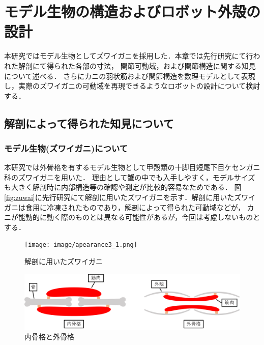 \newpage
\section{モデル生物の構造およびロボット外殻の設計}
本研究ではモデル生物としてズワイガニを採用した．本章では先行研究\cite{hasegawa}にて行われた解剖にて得られた各部の寸法，
関節可動域，および関節構造に関する知見について述べる．
さらにカニの羽状筋および関節構造を数理モデルとして表現し，実際のズワイガニの可動域を再現できるようなロボットの設計について検討する．
\subsection{解剖によって得られた知見について}
\subsubsection{モデル生物(ズワイガニ)について}
本研究では外骨格を有するモデル生物として甲殻類の十脚目短尾下目ケセンガニ科のズワイガニを用いた．
理由として蟹の中でも入手しやすく，モデルサイズも大きく解剖時に内部構造等の確認や測定が比較的容易なためである．
図\ref{fig:zuwai}に先行研究にて解剖に用いたズワイガニを示す．解剖に用いたズワイガニは食用に冷凍されたものであり，解剖によって得られた可動域などが，
カニが能動的に動く際のものとは異なる可能性があるが，今回は考慮しないものとする．
\begin{figure}[b]
  \begin{minipage}[b]{0.49\hsize}
    \centering
    \texttt{[image: image/apearance3\_1.png]}
    \caption{解剖に用いたズワイガニ\cite{hasegawa}}
    \label{fig:zuwai}
  \end{minipage}
  \begin{minipage}[b]{0.49\hsize}
    \vspace{10mm}
    \centering
    \includegraphics[scale=0.058]{image/kokkaku.png}
    \vspace{5mm}
    \caption{内骨格と外骨格\cite{hasegawa}}
    \label{fig:naigai}
  \end{minipage}
\end{figure}
